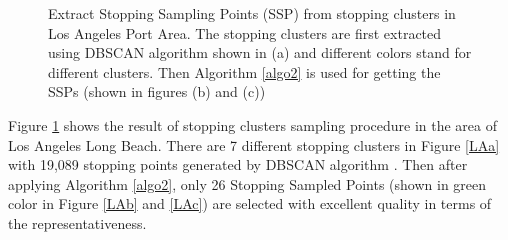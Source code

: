 \documentclass[12pt,glossary]{dalcsthesis}
\begin{document}
\begin{figure}
    \caption{Extract Stopping Sampling Points (SSP) from stopping clusters in Los Angeles Port Area. The stopping clusters are first extracted using DBSCAN \cite{DBScan96} algorithm shown in (a) and different colors stand for different clusters. Then Algorithm \ref{algo2} is used for getting the SSPs (shown in figures (b) and (c))}
    \label{LA}
\end{figure}





Figure \ref{LA} shows the result of stopping clusters sampling procedure in the area of Los Angeles Long Beach. There are 7 different stopping clusters in Figure \ref{LAa} with 19,089 stopping points generated by DBSCAN algorithm \cite{DBScan96}. Then after applying Algorithm \ref{algo2}, only 26  Stopping Sampled Points (shown in green color in Figure \ref{LAb} and \ref{LAc}) are selected with excellent quality in terms of the representativeness.
\end{document}
